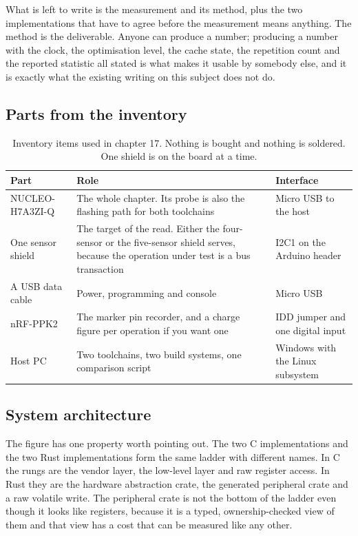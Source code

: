 What is left to write is the measurement and its method, plus the two
implementations that have to agree before the measurement means anything. The
method is the deliverable. Anyone can produce a number; producing a number with
the clock, the optimisation level, the cache state, the repetition count and the
reported statistic all stated is what makes it usable by somebody else, and it
is exactly what the existing writing on this subject does not do.

\subsection*{Parts from the inventory}

\begin{table}[H]\centering\small
\begin{tabular}{p{40mm}p{66mm}p{40mm}}
\toprule
Part & Role & Interface \\
\midrule
NUCLEO-H7A3ZI-Q & The whole chapter. Its probe is also the flashing path for both toolchains & Micro USB to the host \\
One sensor shield & The target of the read. Either the four-sensor or the five-sensor shield serves, because the operation under test is a bus transaction & I2C1 on the Arduino header \\
A USB data cable & Power, programming and console & Micro USB \\
nRF-PPK2 & The marker pin recorder, and a charge figure per operation if you want one & IDD jumper and one digital input \\
Host PC & Two toolchains, two build systems, one comparison script & Windows with the Linux subsystem \\
\bottomrule
\end{tabular}
\caption{Inventory items used in chapter 17. Nothing is bought and nothing is soldered. One shield is on the board at a time.}
\end{table}

\subsection*{System architecture}


The figure has one property worth pointing out. The two C implementations and
the two Rust implementations form the same ladder with different names. In C the
rungs are the vendor layer, the low-level layer and raw register access. In Rust
they are the hardware abstraction crate, the generated peripheral crate and a
raw volatile write. The peripheral crate is not the bottom of the ladder even
though it looks like registers, because it is a typed, ownership-checked view of
them and that view has a cost that can be measured like any other.

